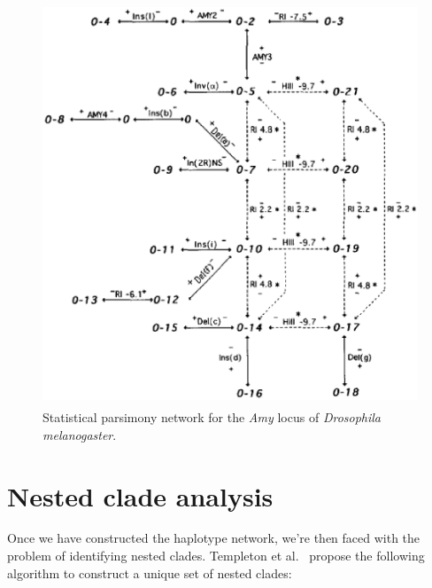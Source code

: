 \documentclass[12pt]{article}
\begin{document}
\begin{figure}
\begin{center}
\includegraphics[height=12cm]{amy-tcs.eps}
\end{center}
\caption{Statistical parsimony network for the {\it Amy\/} locus of
  {\it Drosophila melanogaster}.}\label{fig:amy-tcs}
\end{figure}

\section*{Nested clade analysis}

Once we have constructed the haplotype network, we're then faced with
the problem of identifying nested clades. Templeton et
al.~\cite{Templeton-etal-1987} propose the following algorithm to
construct a unique set of nested clades:
\end{document}
